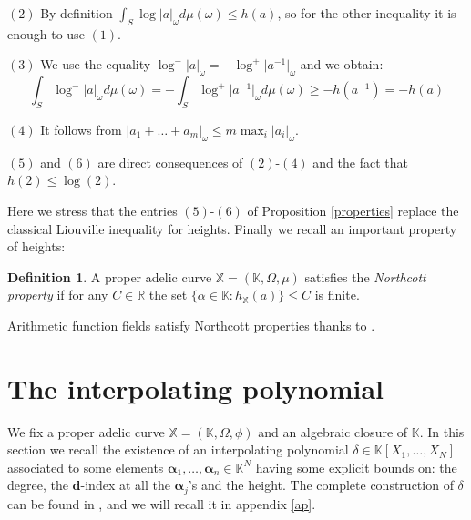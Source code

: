 \documentclass[10 pt,a4paper]{article}
\theoremstyle{plain}
\theoremstyle{definition}
\newtheorem{defn}[thm]{Definition}
\theoremstyle{named}
\begin{document}
 $(2)$ By definition $\int_S\log\vert a\vert_\omega d\mu(\omega)\le h(a)$, so for the other inequality it is enough to use $(1)$.
 
 $(3)$ We use the equality $\log^-\vert a\vert_\omega=-\log^+\vert a^{-1}\vert_\omega$ and we obtain:
\[
\int_S\log^-\vert a\vert_\omega d\mu(\omega)=-\int_S\log^+\vert a^{-1}\vert_\omega d\mu(\omega) \ge -h(a^{-1})=-h(a)
\]

$(4)$ It follows from $\vert a_1+\ldots+a_m \vert_{\omega}\le m \max_i \vert a_i\vert_{\omega}$.
 
 $(5)$ and $(6)$ are  direct consequences of $(2)$-$(4)$ and the fact that $h(2)\le\log(2)$.
\endproof

Here we stress  that the entries $(5)$-$(6)$ of Proposition \ref{properties} replace the classical Liouville inequality  for heights. Finally we recall an important property of heights: 

\begin{defn}
A proper adelic curve $\mathbb X=(\mathbb K,\Omega, \mu)$ satisfies the \emph{Northcott property} if for any $C\in\mathbb R$ the set $\{\alpha\in\mathbb K\colon h_{\mathbb X}(a)\}\le C$ is finite.
\end{defn}

Arithmetic function fields satisfy Northcott properties thanks to \cite[Theorem 4.3]{Mor}.

\section{The interpolating polynomial}\label{aux}

We fix a proper adelic curve $\mathbb X=(\mathbb K,\Omega, \phi)$  and an algebraic closure of $\mathbb K$. In this section we recall the existence of an interpolating polynomial $\delta\in\mathbb K[X_1,\ldots,X_N]$ associated to  some elements $\bm{\alpha}_1,\ldots,\bm{\alpha}_n\in\mathbb K^N$ having some explicit bounds on: the degree, the $\bm{d}$-index at all the $\bm{\alpha}_j$'s and the height. The complete construction of $\delta$ can be found in \cite{C}, and we will recall it in appendix \ref{ap}.
\end{document}
